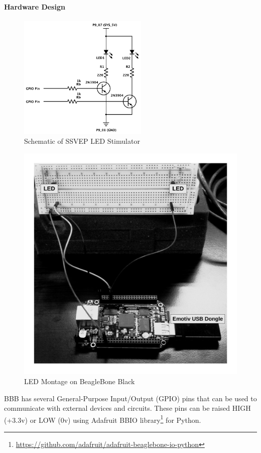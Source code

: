 \documentclass[12pt]{article}
\newcommand\mysubsubsubsection[1]{\paragraph{#1}\hspace{0pt}}
\numberwithin{equation}{section}
\numberwithin{figure}{section}
\numberwithin{table}{section}
\begin{document}
\mysubsubsubsection{Hardware Design}
\par{
    \begin{figure}[ht]
        \centering
        \includegraphics[width=0.55\textwidth]{images/led_circuit}
        \caption{Schematic of SSVEP LED Stimulator}
        \label{fig:bbb_led_schema}
    \end{figure}

    \begin{figure}[ht]
    \centering
    \includegraphics[scale=0.55]{images/bbb_ssvep}
    \caption{LED Montage on BeagleBone Black}
    \label{fig:bbb_ssvep}
    \end{figure}
    BBB has several General-Purpose Input/Output (GPIO) pins that can be used to communicate with external
    devices and circuits. These pins can be raised HIGH (+3.3v) or LOW (0v)
    using Adafruit BBIO library\footnote{\url{https://github.com/adafruit/adafruit-beaglebone-io-python}} for Python.
}
\end{document}
